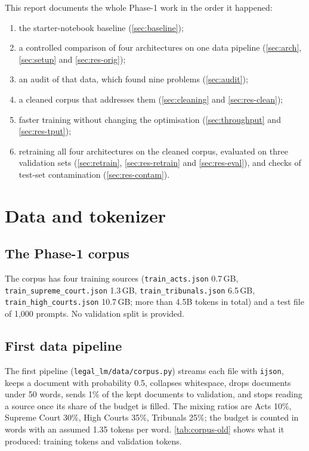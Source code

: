 \documentclass[11pt,a4paper]{article}
\newcommand{\code}[1]{\texttt{\small #1}}
\begin{document}
This report documents the whole Phase-1 work in the order it happened:
\begin{enumerate}
  \item the starter-notebook baseline (\autoref{sec:baseline});
  \item a controlled comparison of four architectures on one data pipeline (\autoref{sec:arch}, \autoref{sec:setup} and \autoref{sec:res-orig});
  \item an audit of that data, which found nine problems (\autoref{sec:audit});
  \item a cleaned corpus that addresses them (\autoref{sec:cleaning} and \autoref{sec:res-clean});
  \item faster training without changing the optimisation (\autoref{sec:throughput} and \autoref{sec:res-tput});
  \item retraining all four architectures on the cleaned corpus, evaluated on three validation sets
        (\autoref{sec:retrain}, \autoref{sec:res-retrain} and \autoref{sec:res-eval}), and checks of test-set contamination (\autoref{sec:res-contam}).
\end{enumerate}

\section{Data and tokenizer}\label{sec:data}
\subsection{The Phase-1 corpus}
The corpus has four training sources (\code{train\_acts.json} 0.7\,GB, \code{train\_supreme\_court.json}
1.3\,GB, \code{train\_tribunals.json} 6.5\,GB, \code{train\_high\_courts.json} 10.7\,GB; more than 4.5B
tokens in total) and a test file of 1{,}000 prompts.  No validation split is provided.

\subsection{First data pipeline}\label{sec:firstpipe}
The first pipeline (\code{legal\_lm/data/corpus.py}) streams each file with \code{ijson}, keeps a document
with probability 0.5, collapses whitespace, drops documents under 50 words, sends 1\% of the kept documents
to validation, and stops reading a source once its share of the budget is filled.  The mixing ratios are
Acts 10\%, Supreme Court 30\%, High Courts 35\%, Tribunals 25\%; the budget is counted in words with an
assumed 1.35 tokens per word.  \autoref{tab:corpus-old} shows what it produced: \oldtraintokens{} training
tokens and \oldvaltokens{} validation tokens.
\end{document}
